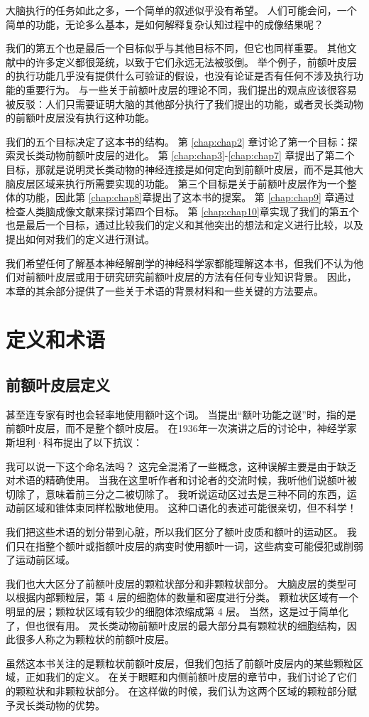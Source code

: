 大脑执行的任务如此之多，一个简单的叙述似乎没有希望。
人们可能会问，一个简单的功能，无论多么基本，是如何解释复杂认知过程中的成像结果呢？
\par
我们的第五个也是最后一个目标似乎与其他目标不同，但它也同样重要。
其他文献中的许多定义都很笼统，以致于它们永远无法被驳倒。
举个例子，前额叶皮层的执行功能几乎没有提供什么可验证的假设，也没有论证是否有任何不涉及执行功能的重要行为。
与一些关于前额叶皮层的理论不同，我们提出的观点应该很容易被反驳：人们只需要证明大脑的其他部分执行了我们提出的功能，或者灵长类动物的前额叶皮层没有执行这种功能。
\par
我们的五个目标决定了这本书的结构。
第 \ref{chap:chap2} 章讨论了第一个目标：探索灵长类动物前额叶皮层的进化。
第 \ref{chap:chap3}-\ref{chap:chap7} 章提出了第二个目标，那就是说明灵长类动物的神经连接是如何定向到前额叶皮层，而不是其他大脑皮层区域来执行所需要实现的功能。
第三个目标是关于前额叶皮层作为一个整体的功能，因此第 \ref{chap:chap8}章提出了这本书的提案。
第 \ref{chap:chap9} 章通过检查人类脑成像文献来探讨第四个目标。
第 \ref{chap:chap10}章实现了我们的第五个也是最后一个目标，通过比较我们的定义和其他突出的想法和定义进行比较，以及提出如何对我们的定义进行测试。
\par
我们希望任何了解基本神经解剖学的神经科学家都能理解这本书，但我们不认为他们对前额叶皮层或用于研究研究前额叶皮层的方法有任何专业知识背景。
因此，本章的其余部分提供了一些关于术语的背景材料和一些关键的方法要点。



\section{定义和术语}
\subsection{前额叶皮层定义}
甚至连专家有时也会轻率地使用额叶这个词。
当提出“额叶功能之谜”时，指的是前额叶皮层，而不是整个额叶皮层\cite{teube1964riddle}。
在1936年一次演讲之后的讨论中，神经学家斯坦利·科布提出了以下抗议\cite{fulton1932relation}：
\par
我可以说一下这个命名法吗？
这完全混淆了一些概念，这种误解主要是由于缺乏对术语的精确使用。
当我在这里听作者和讨论者的交流时候，我听他们说额叶被切除了，意味着前三分之二被切除了。
我听说运动区过去是三种不同的东西，运动前区域和锥体束同样松散地使用。
这种口语化的表述可能很亲切，但不科学！
\par
我们把这些术语的划分带到心脏，所以我们区分了额叶皮质和额叶的运动区。
我们只在指整个额叶或指额叶皮层的病变时使用额叶一词，这些病变可能侵犯或削弱了运动前区域。
\par
我们也大大区分了前额叶皮层的颗粒状部分和非颗粒状部分。
大脑皮层的类型可以根据内部颗粒层，第 4 层的细胞体的数量和密度进行分类。
颗粒状区域有一个明显的层；颗粒状区域有较少的细胞体浓缩成第 4 层。
当然，这是过于简单化了，但也很有用。
灵长类动物前额叶皮层的最大部分具有颗粒状的细胞结构，因此很多人称之为颗粒状的前额叶皮层。
\par
虽然这本书关注的是颗粒状前额叶皮层，但我们包括了前额叶皮层内的某些颗粒区域，正如我们的定义。
在关于眼眶和内侧前额叶皮层的章节中，我们讨论了它们的颗粒状和非颗粒状部分。
在这样做的时候，我们认为这两个区域的颗粒部分赋予灵长类动物的优势。

